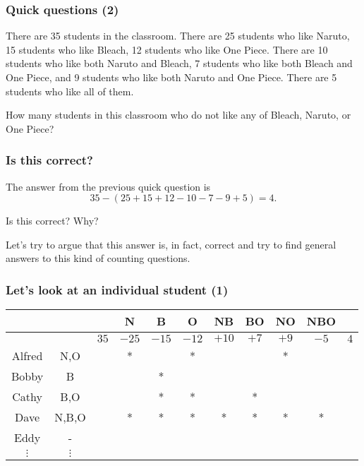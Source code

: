 \begin{frame}\frametitle{Quick questions (2)}
  \begin{tcolorbox}
    There are 35 students in the classroom.  There are 25 students who
    like Naruto, 15 students who like Bleach, 12 students who like One
    Piece.  There are 10 students who like both Naruto and Bleach, 7
    students who like both Bleach and One Piece, and 9 students who
    like both Naruto and One Piece.  There are 5 students who like all
    of them.

    How many students in this classroom who do not like any of Bleach,
    Naruto, or One Piece?
  \end{tcolorbox}

  \vspace{1.2in}
\end{frame}

\begin{frame}\frametitle{Is this correct?}
  The answer from the previous quick question is
  \[ 35 - (25 + 15 + 12 - 10 - 7 - 9 + 5) = 4.\]

  Is this correct?  Why?

  \pause

  \vspace{0.2in}

  Let's try to argue that this answer is, in fact, correct and try to
  find general answers to this kind of counting questions.
\end{frame}

\begin{frame}\frametitle{Let's look at an individual student (1)}
  {\small
  \begin{tabular}{c|c||c|c|c|c|c|c|c|c||c}
    & &  & N & B & O & NB & BO & NO & NBO & \\
    \hline
    & & $35$ & $-25$ & $-15$ & $-12$ & $+10$ & $+7$ & $+9$ & $-5$ & $4$ \\
    \hline
    Alfred & N,O & \pause * & * & & * & & & * & & \\
    Bobby & B & \pause * & & * & & & & & & \\
    Cathy & B,O & \pause * & & * & * & & * & & & \\
    Dave & N,B,O & \pause * & * & * & * & * & * & * & * & \\
    Eddy & - & \pause * & &  & & & & & & \\
    $\vdots$ & $\vdots$ & & & & & & & & & \\
  \end{tabular}
  }
\end{frame}

